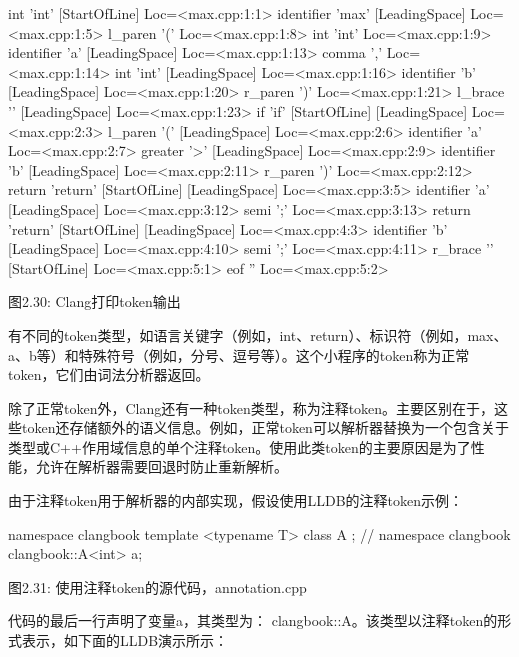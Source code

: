 \begin{shell}
int 'int'        [StartOfLine]  Loc=<max.cpp:1:1>
identifier 'max'         [LeadingSpace] Loc=<max.cpp:1:5>
l_paren '('             Loc=<max.cpp:1:8>
int 'int'               Loc=<max.cpp:1:9>
identifier 'a'   [LeadingSpace] Loc=<max.cpp:1:13>
comma ','               Loc=<max.cpp:1:14>
int 'int'        [LeadingSpace] Loc=<max.cpp:1:16>
identifier 'b'   [LeadingSpace] Loc=<max.cpp:1:20>
r_paren ')'             Loc=<max.cpp:1:21>
l_brace '{'      [LeadingSpace] Loc=<max.cpp:1:23>
if 'if'  [StartOfLine] [LeadingSpace]   Loc=<max.cpp:2:3>
l_paren '('      [LeadingSpace] Loc=<max.cpp:2:6>
identifier 'a'          Loc=<max.cpp:2:7>
greater '>'      [LeadingSpace] Loc=<max.cpp:2:9>
identifier 'b'   [LeadingSpace] Loc=<max.cpp:2:11>
r_paren ')'             Loc=<max.cpp:2:12>
return 'return'  [StartOfLine] [LeadingSpace]   Loc=<max.cpp:3:5>
identifier 'a'   [LeadingSpace] Loc=<max.cpp:3:12>
semi ';'                Loc=<max.cpp:3:13>
return 'return'  [StartOfLine] [LeadingSpace]   Loc=<max.cpp:4:3>
identifier 'b'   [LeadingSpace] Loc=<max.cpp:4:10>
semi ';'                Loc=<max.cpp:4:11>
r_brace '}'      [StartOfLine]  Loc=<max.cpp:5:1>
eof ''          Loc=<max.cpp:5:2>
\end{shell}

\begin{center}
图2.30: Clang打印token输出
\end{center}

有不同的token类型，如语言关键字（例如，int、return）、标识符（例如，max、a、b等）和特殊符号（例如，分号、逗号等）。这个小程序的token称为正常token，它们由词法分析器返回。

除了正常token外，Clang还有一种token类型，称为注释token。主要区别在于，这些token还存储额外的语义信息。例如，正常token可以解析器替换为一个包含关于类型或C++作用域信息的单个注释token。使用此类token的主要原因是为了性能，允许在解析器需要回退时防止重新解析。

由于注释token用于解析器的内部实现，假设使用LLDB的注释token示例：

\begin{cpp}
namespace clangbook {
template <typename T> class A {};
} // namespace clangbook
clangbook::A<int> a;
\end{cpp}

\begin{center}
图2.31: 使用注释token的源代码，annotation.cpp
\end{center}

代码的最后一行声明了变量a，其类型为： clangbook::A。该类型以注释token的形式表示，如下面的LLDB演示所示：

